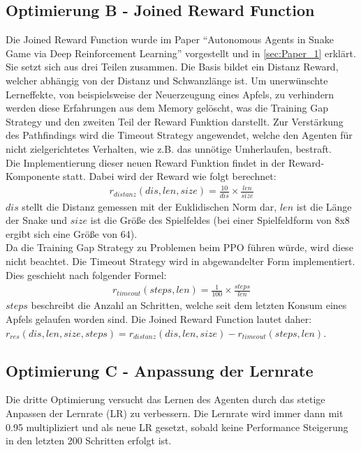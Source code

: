 \subsection{Optimierung B - Joined Reward Function} \label{sec:Konzept_Optimierung02}
Die Joined Reward Function wurde im Paper "`Autonomous Agents in Snake Game via Deep Reinforcement Learning"' \cite{Autonomous_Agents_in_Snake_Game_via_DRL} vorgestellt und in \ref{sec:Paper_1} erklärt. Sie setzt sich aus drei Teilen zusammen. Die Basis bildet ein Distanz Reward, welcher abhängig von der Distanz und Schwanzlänge ist. Um unerwünschte Lerneffekte, von beispielsweise der Neuerzeugung eines Apfels, zu verhindern werden diese Erfahrungen aus dem Memory gelöscht, was die Training Gap Strategy und den zweiten Teil der Reward Funktion darstellt. Zur Verstärkung des Pathfindings wird die Timeout Strategy angewendet, welche den Agenten für nicht zielgerichtetes Verhalten, wie z.B. das unnötige Umherlaufen, bestraft.\\
Die Implementierung dieser neuen Reward Funktion findet in der Reward-Komponente statt. Dabei wird der Reward wie folgt berechnet:
\begin{align}
	r_{distanz}(dis, len, size) = \frac{10}{dis} \times \frac{len}{size}
\end{align}
$dis$ stellt die Distanz gemessen mit der Euklidischen Norm dar, $len$ ist die Länge der Snake und $size$ ist die Größe des Spielfeldes (bei einer Spielfeldform von 8x8 ergibt sich eine Größe von 64).\\ Da die Training Gap Strategy zu Problemen beim PPO führen würde, wird diese nicht beachtet. Die Timeout Strategy wird in abgewandelter Form implementiert. Dies geschieht nach folgender Formel:
\begin{align}
	r_{timeout}(steps, len) = \frac{1}{100} \times \frac{steps}{len}
\end{align}
$steps$ beschreibt die Anzahl an Schritten, welche seit dem letzten Konsum eines Apfels gelaufen worden sind. 
Die Joined Reward Function lautet daher: $r_{res}(dis, len, size, steps) = 	r_{distanz}(dis, len, size) - r_{timeout}(steps, len)$.

\subsection{Optimierung C - Anpassung der Lernrate} \label{sec:Konzept_Optimierung03}
Die dritte Optimierung versucht das Lernen des Agenten durch das stetige Anpassen der Lernrate (LR) zu verbessern. 
Die Lernrate wird immer dann mit 0.95 multipliziert und als neue LR gesetzt, sobald keine Performance Steigerung in den letzten 200 Schritten erfolgt ist.

